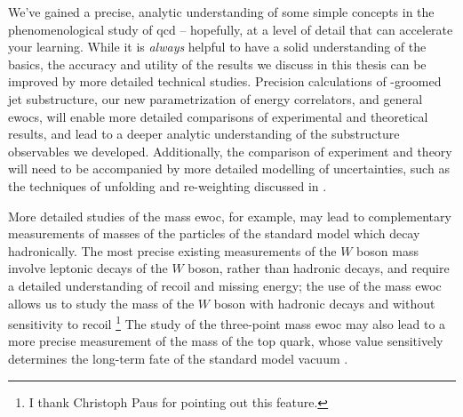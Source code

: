 We've gained a precise, analytic understanding of some simple concepts in the phenomenological study of \gls{qcd} -- hopefully, at a level of detail that can accelerate your learning.
%
While it is \textit{always} helpful to have a solid understanding of the basics, the accuracy and utility of the results we discuss in this thesis can be improved by more detailed technical studies.
%
Precision calculations of \PIRANHA-groomed jet substructure, our new parametrization of energy correlators, and general \glspl{ewoc}, will enable more detailed comparisons of experimental and theoretical results, and lead to a deeper analytic understanding of the substructure observables we developed.
%
Additionally, the comparison of experiment and theory will need to be accompanied by more detailed modelling of uncertainties, such as the techniques of unfolding and re-weighting discussed in .

More detailed studies of the mass \gls{ewoc}, for example, may lead to complementary measurements of masses of the particles of the standard model which decay hadronically.
%
The most precise existing measurements of the \(W\) boson mass involve leptonic decays of the \(W\) boson, rather than hadronic decays, and require a detailed understanding of recoil and missing energy;
%
the use of the mass \gls{ewoc} allows us to study the mass of the \(W\) boson with hadronic decays and without sensitivity to recoil%
\footnote{
    I thank Christoph Paus for pointing out this feature.
}
%
The study of the three-point mass \gls{ewoc} may also lead to a more precise measurement of the mass of the top quark, whose value sensitively determines the long-term fate of the standard model vacuum \cite{Alekhin:2012py}.

